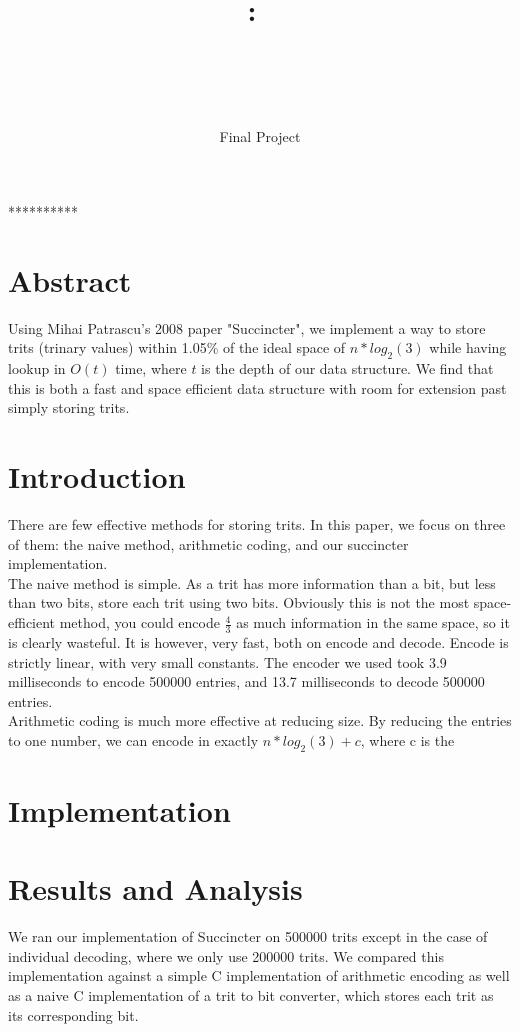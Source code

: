 \documentclass{article}
\title{\textmd{\textbf{\Class:\ \Title}}\\\normalsize\vspace{0.1in}\small{ \Date}\\\vspace{0.1in}\large{\textit{\ClassInstructor\ \ClassTime}}}
\author{\textbf{\AuthorName}}
\date{Final Project}
\begin{document}
\maketitle

\bigskip
\centerline{**********}

\noindent \section{Abstract}
Using Mihai Patrascu's 2008 paper "Succincter",  we implement a way to store trits (trinary values) within 1.05\% of the ideal space of $n*log_2(3)$ while having lookup in $O(t)$ time, where $t$ is the depth of our data structure. We find that this is both a fast and space efficient data structure with room for extension past simply storing trits.

\noindent \section{Introduction}

There are few effective methods for storing trits. In this paper, we focus on three of them: the naive method, arithmetic coding, and our succincter implementation.\\
The naive method is simple. As a trit has more information than a bit, but less than two bits, store each trit using two bits. Obviously this is not the most space-efficient method, you could encode $\frac{4}{3}$ as much information in the same space, so it is clearly wasteful. It is however, very fast, both on encode and decode. Encode is strictly linear, with very small constants. The encoder we used took 3.9 milliseconds to encode 500000 entries, and 13.7 milliseconds to decode 500000 entries.\\
Arithmetic coding is much more effective at reducing size. By reducing the entries to one number, we can encode in exactly $n*log_2(3) + c$, where c is the 

\noindent \section{Implementation}


\bigskip

\noindent \section{Results and Analysis}

We ran our implementation of Succincter on 500000 trits except in the case of individual decoding, where we only use 200000 trits. We compared this implementation against a simple C implementation of arithmetic encoding as well as a naive C implementation of a trit to bit converter, which stores each trit as its corresponding bit.
\end{document}
